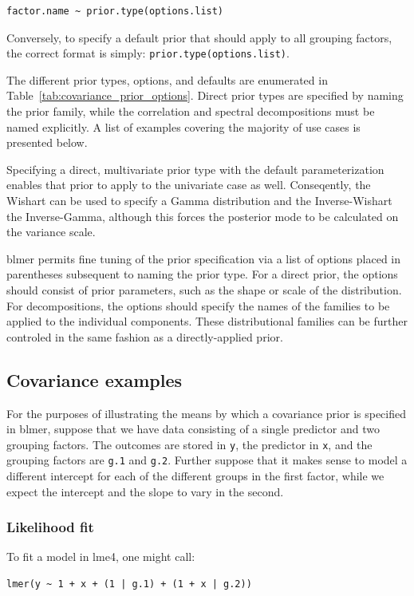 \documentclass[10pt]{article}
\newcommand{\pkg}[1]{{\fontseries{b}\selectfont #1}}
\newcommand{\code}[1]{\texttt{#1}}
\begin{document}
\begin{verbatim}
factor.name ~ prior.type(options.list)
\end{verbatim}

\noindent Conversely, to specify a default prior that should apply to
all grouping factors, the correct format is simply:
\code{prior.type(options.list)}.

The different prior types, options, and defaults are enumerated in Table~\ref{tab:covariance_prior_options}. Direct prior types are specified
by naming the prior family, while the correlation and spectral
decompositions must be named explicitly. A list of examples covering
the majority of use cases is presented below.

Specifying a direct,
multivariate prior type with the default parameterization enables that prior
to apply to the univariate case as well. Conseqently, the Wishart can be
used to specify a Gamma distribution and the Inverse-Wishart the
Inverse-Gamma, although this forces the posterior mode to be calculated on the
variance scale.

\pkg{blmer} permits fine tuning of the prior specification
via a list of options placed in parentheses subsequent to naming the
prior type. For a direct prior, the options should consist of prior
parameters, such as the shape or scale of the distribution. For
decompositions, the options should specify the names of the families
to be applied to the individual components. These distributional families 
can be further controled in the same fashion as a directly-applied
prior.

\subsection[Covariance examples]{Covariance examples}

For the purposes of illustrating the means by which a covariance prior
is specified in \pkg{blmer}, suppose that we have data consisting of a single predictor and two
grouping factors. The outcomes are stored in \code{y}, the predictor
in \code{x}, and the grouping factors are \code{g.1} and
\code{g.2}. Further suppose that it makes sense to model a different
intercept for each of the different groups in the first factor, while
we expect the intercept and the slope to vary in the second.

\subsubsection*{Likelihood fit} To fit a model in \pkg{lme4}, one might
call:
\begin{verbatim}
lmer(y ~ 1 + x + (1 | g.1) + (1 + x | g.2))
\end{verbatim}
\end{document}
